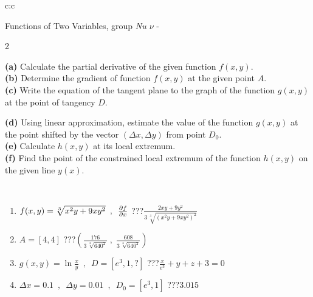 \documentclass[10pt]{report}
\begin{document}
\begin{tabular}{c:c}
\begin{minipage}[c][104.5mm][t]{0.5\linewidth}
\begin{center}
\vspace{7mm}
{\huge \LARGE Functions of Two Variables, group \textit{Nu $\nu$} -}\\[5mm]
\begin{minipage}{0.95\linewidth}
\begin{center}
{\small \begin{multicols}{2} \raggedright
\textbf{(a)} Calculate the partial derivative of the given function \(f(x,y)\). \\[1mm]
\textbf{(b)} Determine the gradient of function \(f(x,y)\) at the given point \(A\). \\[1mm]
\textbf{(c)} Write the equation of the tangent plane to the graph of the function \(g(x,y)\) at the point of tangency \(D\). \par \columnbreak
\textbf{(d)} Using linear approximation, estimate the value of the function \(g(x,y)\) at the point shifted by the vector \((\Delta x, \Delta y)\) from point \(D_0\). \\[1mm]
\textbf{(e)} Calculate \(h(x,y)\) at its local extremum. \\[1mm]
\textbf{(f)} Find the point of the constrained local extremum of the function \(h(x,y)\) on the given line \(y(x)\). \\[1mm]
\end{multicols}
}
\end{center}
\end{minipage}
\\[4mm]
\begin{minipage}{0.79\linewidth}
\begin{center}
\begin{varwidth}{\linewidth}
\begin{enumerate}
\normalsizerr
\item $f(x,y) = \sqrt[3]{x^2y + 9xy^2}\enspace , \enspace \pdv{f}{x}$\quad \dotfill\; ???\;\dotfill \quad $\frac{2xy+9y^2}{3\,\sqrt[3]{(x^2y+9xy^2)^{2}}}$
\item $A = [4, 4]$\quad \dotfill\; ???\;\dotfill \quad $\left( \frac{176}{3\,\sqrt[3]{640^2}} \;,\; \frac{608}{3\,\sqrt[3]{640^2}} \right)$
\item $g(x,y) = \ln\frac{x}{y} \enspace , \enspace D=[e^{3},1,?]$\quad \dotfill\; ???\;\dotfill \quad $\frac{x}{e^3} + y + z + 3 = 0$
\item $\Delta x = {0.1} \enspace,\enspace \Delta y = {0.01} \enspace,\enspace D_0 = [e^{3},1]$\quad \dotfill\; ???\;\dotfill \quad $3.015$

\end{enumerate}
\end{varwidth}
\end{center}
\end{minipage}
\end{center}
\end{minipage}
\end{tabular}
\end{document}
